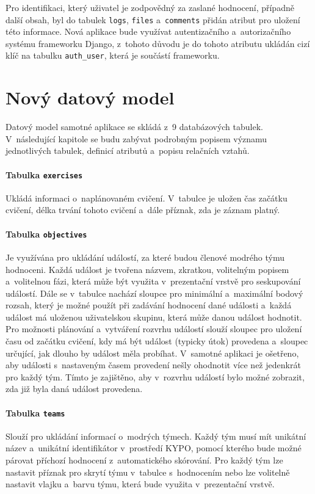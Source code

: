 \documentclass[
  digital,
  twoside,
  table, 
  nolof, 
  nolot
]{fithesis3}
\begin{document}
Pro identifikaci, který uživatel je zodpovědný za zaslané hodnocení, případně další obsah, byl do tabulek \texttt{logs}, \texttt{files} a~\texttt{comments} přidán atribut pro uložení této informace. Nová aplikace bude využívat autentizačního a~autorizačního systému frameworku Django, z~tohoto důvodu je do tohoto atributu ukládán cizí klíč na tabulku \texttt{auth\_user}, která je součástí frameworku.

\section{Nový datový model}

Datový model samotné aplikace se skládá z~9 databázových tabulek. V~následující kapitole se budu zabývat podrobným popisem významu jednotlivých tabulek, definicí atributů a~popisu relačních vztahů.

\paragraph{Tabulka \texttt{exercises}} Ukládá informaci o~naplánovaném cvičení. V~tabulce je uložen čas začátku cvičení, délka trvání tohoto cvičení a~dále příznak, zda je záznam platný.

\paragraph{Tabulka \texttt{objectives}} Je využívána pro ukládání událostí, za které budou členové modrého týmu hodnoceni. Každá událost je tvořena názvem, zkratkou, volitelným popisem a~volitelnou fázi, která může být využita v~prezentační vrstvě pro seskupování událostí. Dále se v~tabulce nachází sloupce pro minimální a~maximální bodový rozsah, který je možné použít při zadávání hodnocení dané události a~každá událost má uloženou uživatelskou skupinu, která může danou událost hodnotit. Pro možnosti plánování a~vytváření rozvrhu událostí slouží sloupec pro uložení času od začátku cvičení, kdy má být událost (typicky útok) provedena a~sloupec určující, jak dlouho by událost měla probíhat. V~samotné aplikaci je ošetřeno, aby události s~nastaveným časem provedení nešly ohodnotit více než jedenkrát pro každý tým. Tímto je zajištěno, aby v~rozvrhu událostí bylo možné zobrazit, zda již byla daná událost provedena. 

\paragraph{Tabulka \texttt{teams}} Slouží pro ukládání informací o~modrých týmech. Každý tým musí mít unikátní název a~unikátní identifikátor v~prostředí KYPO, pomocí kterého bude možné párovat příchozí hodnocení z~automatického skórování. Pro každý tým lze nastavit příznak pro skrytí týmu v~tabulce s~hodnocením nebo lze volitelně nastavit vlajku a~barvu týmu, která bude využita v~prezentační vrstvě.
\end{document}
